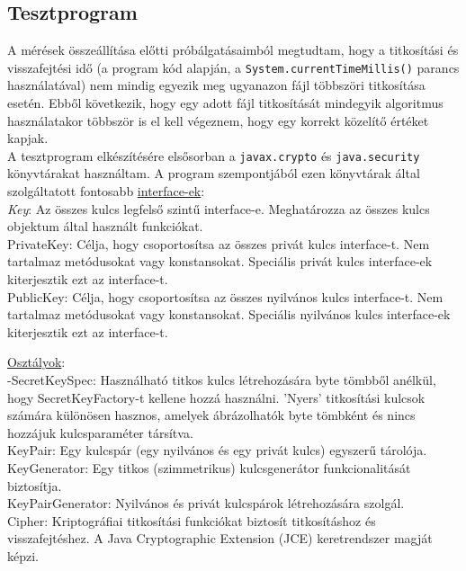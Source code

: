 \subsection{Tesztprogram}
\vspace{5pt}\noindent A mérések összeállítása előtti próbálgatásaimból megtudtam, hogy a titkosítási és visszafejtési idő (a program kód alapján, a \texttt{System.currentTimeMillis()} parancs használatával) nem mindig egyezik meg ugyanazon fájl többszöri titkosítása esetén. Ebből következik, hogy egy adott fájl titkosítását mindegyik algoritmus használatakor többször is el kell végeznem, hogy egy korrekt közelítő értéket kapjak.
\vspace{5pt}\\A tesztprogram elkészítésére elsősorban a \texttt{javax.crypto} és \texttt{java.security} könyvtárakat használtam. A program szempontjából ezen könyvtárak által szolgáltatott fontosabb
 \underline{interface-ek}:
\vspace{5pt}\\\textit{Key}: Az összes kulcs legfelső szintű interface-e. Meghatározza az összes kulcs objektum által használt funkciókat.
\vspace{5pt}\\PrivateKey: Célja, hogy csoportosítsa az összes privát kulcs interface-t. Nem tartalmaz metódusokat vagy konstansokat. Speciális privát kulcs interface-ek kiterjesztik ezt az interface-t. 
\vspace{5pt}\\PublicKey: Célja, hogy csoportosítsa az összes nyilvános kulcs interface-t. Nem tartalmaz metódusokat vagy konstansokat. Speciális nyilvános kulcs interface-ek kiterjesztik ezt az interface-t. \newline

\noindent \underline{Osztályok}:
\vspace{5pt}\\-SecretKeySpec: Használható titkos kulcs létrehozására byte tömbből anélkül, hogy SecretKeyFactory-t kellene hozzá használni. ’Nyers’ titkosítási kulcsok számára különösen hasznos, amelyek ábrázolhatók byte tömbként és nincs hozzájuk kulcsparaméter társítva.
\vspace{5pt}\\KeyPair: Egy kulcspár (egy nyilvános és egy privát kulcs) egyszerű tárolója.
\vspace{5pt}\\KeyGenerator: Egy titkos (szimmetrikus) kulcsgenerátor funkcionalitását biztosítja.
\vspace{5pt}\\KeyPairGenerator: Nyilvános és privát kulcspárok létrehozására szolgál.
\vspace{5pt}\\Cipher: Kriptográfiai titkosítási funkciókat biztosít titkosításhoz és visszafejtéshez. A Java Cryptographic Extension (JCE) keretrendszer magját képzi. \newline

